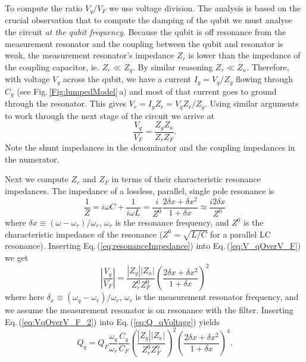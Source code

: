 To compute the ratio $V_q/V_F$ we use voltage division. The analysis is based on the crucial observation that to compute the damping of the qubit we must analyse the circuit \emph{at the qubit frequency}. Because the qubit is off resonance from the measurement resonator and the coupling between the qubit and resonator is weak, the measurement resonator's impedance $Z_r$ is lower than the impedance of the coupling capacitor, ie. $Z_r \ll Z_g$. By similar reasoning $Z_r \ll Z_{\kappa}$. Therefore, with voltage $V_q$ across the qubit, we have a current $I_g = V_q / Z_g$ flowing through $C_g$ (see Fig.\,\ref{Fig:lumpedModel}\,a) and most of that current goes to ground through the resonator. This gives $V_r = I_g Z_r = V_q Z_r/Z_g$. Using similar arguments to work through the next stage of the circuit we arrive at \begin{equation}
\frac{V_q}{V_F} = \frac{Z_g Z_{\kappa}}{Z_r Z_F}. \label{eq:V_qOverV_F} \end{equation}
Note the shunt impedances in the denominator and the coupling impedances in the numerator.

Next we compute $Z_r$ and $Z_F$ in terms of their characteristic resonance impedances. The impedance of a lossless, parallel, single pole resonance is \begin{equation}
\frac{1}{Z} = i \omega C + \frac{1}{i \omega L} = \frac{i}{Z^0} \frac{2\delta x + \delta x^2}{1 + \delta x} \approx \frac{i 2 \delta x}{Z^0} \label{eq:resonanceImpedance} \end{equation}
where $\delta x \equiv (\omega - \omega_r)/\omega_r$, $\omega_r$ is the resonance frequency, and $Z^0$ is the characteristic impedance of the resonance ($Z^0 = \sqrt{L/C}$ for a parallel LC resonance). Inserting Eq.\,(\ref{eq:resonanceImpedance}) into Eq.\,(\ref{eq:V_qOverV_F}) we get \begin{equation}
\left| \frac{V_q}{V_F} \right| = \frac{\left| Z_g \right| \left| Z_{\kappa} \right|}{Z_r^0 Z_F^0} \left( \frac{2\delta x + \delta x^2}{1 + \delta x} \right)^2 \label{eq:VqOverV_F_2} \end{equation}
where here $\delta_x \equiv (\omega_q - \omega_r)/\omega_r$, $\omega_r$ is the measurement resonator frequency, and we assume the measurement resonator is on resonance with the filter. Inserting Eq.\,(\ref{eq:VqOverV_F_2}) into Eq.\,(\ref{eq:Q_qVoltage}) yields \begin{equation}
Q_q = Q_F \frac{\omega_q}{\omega_r} \frac{C_q}{C_F} \left( \frac{\left| Z_g \right| \left| Z_{\kappa} \right|}{Z_r^0 Z_F^0} \right)^2 \left( \frac{2\delta x + \delta x^2}{1 + \delta x } \right)^4. \label{eq:Q_qZ} \end{equation}

